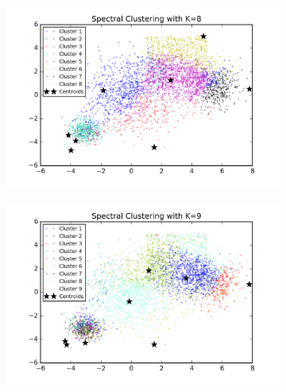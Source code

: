 \begin{description}
\begin{description}
\begin{figure}[!h]
\begin{subfigure}[b]{0.475\textwidth}
        \end{subfigure}
        \hfill
        \begin{subfigure}[b]{0.475\textwidth}  
            \centering 
            \includegraphics[width=\textwidth]{./figures/bigClustering_spectral_8.png}
        \end{subfigure}
        \begin{subfigure}[b]{0.475\textwidth}   
            \centering 
            \includegraphics[width=\textwidth]{./figures/bigClustering_spectral_9.png}
        \end{subfigure}
        \hfill
        \begin{subfigure}[b]{0.475\textwidth}   
            \centering 

\end{subfigure}
\end{figure}
\end{description}
\end{description}
